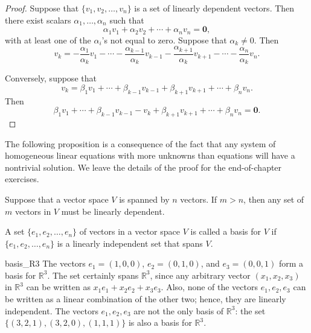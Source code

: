 \begin{proof}
Suppose that $\{ v_1, v_2, \dots, v_n \}$ is a set of linearly dependent
vectors.  Then there exist scalars $\alpha_1, \ldots, \alpha_n$
such that
\[
\alpha_1 v_1 + \alpha_2 v_2 + \cdots + \alpha_n v_n = {\mathbf 0 },
\]
with at least one of the $\alpha_i$'s not equal to zero.  Suppose that
$\alpha_k \neq 0$. Then 
\[
v_k = - \frac{\alpha_1}{\alpha_k} v_1 
- \cdots 
- \frac{\alpha_{k-1}}{\alpha_k}	v_{k-1}
- \frac{\alpha_{k+1}}{\alpha_k}	v_{k+1}
- \cdots 
- \frac{\alpha_n}{\alpha_k} v_n.
\]


Conversely, suppose that 
\[
v_k = \beta_1 v_1 
+ \cdots 
+ \beta_{k-1} v_{k-1}
+ \beta_{k+1} v_{k+1}
+ \cdots 
+ \beta_n v_n.
\]
Then
\[
\beta_1 v_1 
+ \cdots 
+ \beta_{k-1} v_{k-1}
- v_k
+ \beta_{k+1} v_{k+1}
+ \cdots 
+ \beta_n v_n = {\mathbf 0}.
\]
\end{proof}

\medskip


The following proposition is a consequence of the fact that any system
of homogeneous linear equations with more unknowns than equations will
have a nontrivial solution.  We leave the details of the proof for the
end-of-chapter exercises. 
 

\begin{proposition}
Suppose that a vector space $V$ is spanned by $n$ vectors. If $m > n$,
then any set of $m$ vectors in $V$ must be linearly dependent. 
\end{proposition}
 
  
A set $\{ e_1, e_2, \ldots, e_n \}$ of vectors in a vector space $V$
is called a {\bfi basis\/} for $V$ if $\{
e_1, e_2, \ldots, e_n \}$ is a linearly independent set that spans
$V$.

 
 
\begin{example}{basis_R3}
The vectors $e_1 = (1, 0, 0)$, $e_2 = (0, 1, 0)$, and $e_3 =(0, 0, 1)$
form a basis for ${\mathbb R}^3$.  The set certainly spans ${\mathbb R}^3$,
since any arbitrary vector $(x_1, x_2, x_3)$ in ${\mathbb R}^3$ can be
written as $x_1 e_1 + x_2 e_2 + x_3 e_3$. Also, none of the vectors
$e_1, e_2, e_3$ can be written as a linear combination of the other
two; hence, they are linearly independent.  The vectors $e_1, e_2,
e_3$ are not the only basis of ${\mathbb R}^3$:  the set $\{ (3, 2, 1),
(3, 2, 0), (1, 1, 1) \}$ is also a basis for ${\mathbb R}^3$. 
\end{example}

 
 
